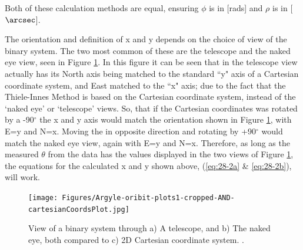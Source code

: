 \documentclass[10pt,preprint]{aastex}
\begin{document}
Both of these calculation methods are equal, ensuring $\phi$ is in [rads] and $\rho$ is in [$\arcsec$].

The orientation and definition of x and y depends on the choice of view of the binary system.  The two most common of these are the telescope and the naked eye view, seen in Figure \ref{fig:4}.  In this figure it can be seen that in the telescope view actually has its North axis being matched to the standard ``y" axis of a Cartesian coordinate system, and East matched to the ``x" axis; due to the fact that the Thiele-Innes Method is based on the Cartesian coordinate system, instead of the `naked eye' or `telescope' views.  So, that if the Cartesian coordinates was rotated by a -90$^\circ$ the x and y axis would match the orientation shown in Figure \ref{fig:4}, with E=y and N=x.  Moving the in opposite direction and rotating by +90$^\circ$ would match the naked eye view, again with E=y and N=x.  Therefore, as long as the measured $\theta$ from the data has the values displayed in the two views of Figure \ref{fig:4}, the equations for the calculated x and y shown above, (\ref{eq:28-2a} \& \ref{eq:28-2b}), will work.


\begin{figure}[ht]
\begin{center}
\texttt{[image: Figures/Argyle-oribit-plots1-cropped-AND-cartesianCoordsPlot.jpg]}
\caption[View of a Binary System]{ View of a binary system through a) A telescope, and b) The naked eye, both compared to c) 2D Cartesian coordinate system. \citet{Argyle}. }
\label{fig:4}
\end{center}
\end{figure}

\end{document}
